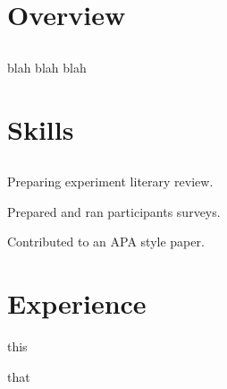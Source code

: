 \documentclass{resume}
\begin{document}
\author{Alexander Ratnikov}
\maketitle

\section{Overview}

\subsection{}

blah blah blah

\section{Skills}

\subsection{}

\begin{compactitem}
  \item Preparing experiment literary review.
  \item Prepared and ran participants surveys.
  \item Contributed to an APA style paper.
\end{compactitem}

\section{Experience}

\begin{compactitem}
  \item this
  \item that
\end{compactitem}
\end{document}
